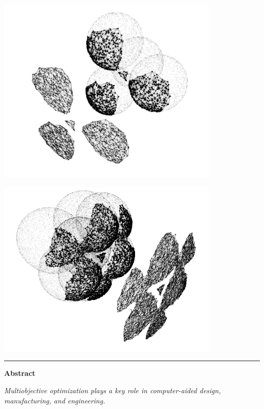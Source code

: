 \documentclass{stdlocal}
\begin{document}
\begin{minipage}[b]{\textwidth}
  \center
  \begin{minipage}[b]{0.4\textwidth}
    \center
    \includegraphics[width=0.8\textwidth]{../../images/3d_pareto_front_tessellation_01.png}
  \end{minipage}
  \begin{minipage}[b]{0.4\textwidth}
    \center
    \includegraphics[width=0.8\textwidth]{../../images/3d_pareto_front_tessellation_02.png}
  \end{minipage}
\end{minipage}
\bigskip
\hrule
\smallskip
  \begin{center}
    \textbf{Abstract}
  \end{center}
  \itshape
  \hspace{10pt}
  Multiobjective optimization plays a key role in computer-aided design, manufacturing, and engineering.
\end{document}
